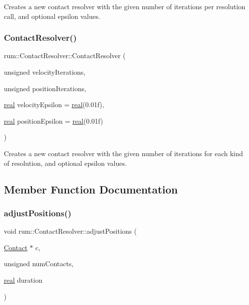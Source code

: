 Creates a new contact resolver with the given number of iterations per resolution call, and optional epsilon values. \mbox{\label{classrum_1_1_contact_resolver_a0d517774fa736afb5eb9098a5051761a}} 
\subsubsection{\texorpdfstring{Contact\+Resolver()}{ContactResolver()}\hspace{0.1cm}{\footnotesize\ttfamily [2/2]}}
{\footnotesize\ttfamily rum\+::\+Contact\+Resolver\+::\+Contact\+Resolver (\begin{DoxyParamCaption}\item[{unsigned}]{velocity\+Iterations,  }\item[{unsigned}]{position\+Iterations,  }\item[{\hyperlink{namespacerum_a7e8cca23573d5eaead0f138cbaa4862c}{real}}]{velocity\+Epsilon = {\ttfamily \hyperlink{namespacerum_a7e8cca23573d5eaead0f138cbaa4862c}{real}(0.01f)},  }\item[{\hyperlink{namespacerum_a7e8cca23573d5eaead0f138cbaa4862c}{real}}]{position\+Epsilon = {\ttfamily \hyperlink{namespacerum_a7e8cca23573d5eaead0f138cbaa4862c}{real}(0.01f)} }\end{DoxyParamCaption})}

Creates a new contact resolver with the given number of iterations for each kind of resolution, and optional epsilon values. 

\subsection{Member Function Documentation}
\mbox{\label{classrum_1_1_contact_resolver_a6900a5545bde3995302f22bdb7c85934}} 
\subsubsection{\texorpdfstring{adjust\+Positions()}{adjustPositions()}}
{\footnotesize\ttfamily void rum\+::\+Contact\+Resolver\+::adjust\+Positions (\begin{DoxyParamCaption}\item[{\hyperlink{classrum_1_1_contact}{Contact} $\ast$}]{c,  }\item[{unsigned}]{num\+Contacts,  }\item[{\hyperlink{namespacerum_a7e8cca23573d5eaead0f138cbaa4862c}{real}}]{duration }\end{DoxyParamCaption})}

